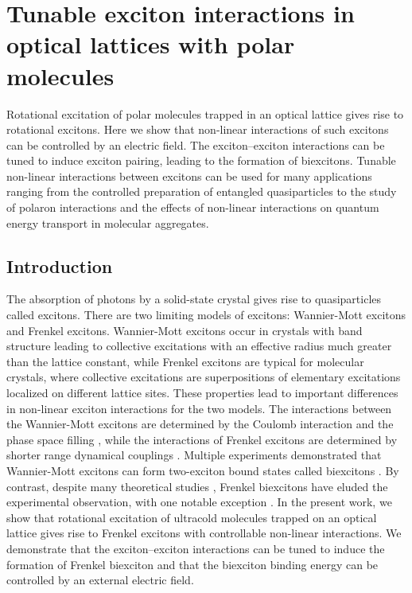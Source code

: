
\chapter{Tunable exciton interactions in optical lattices with polar molecules}
\label{ch:biexciton}

Rotational excitation of polar molecules trapped in an optical lattice gives rise to rotational excitons. Here we show
 that non-linear interactions of such excitons can be controlled by an electric field. The exciton--exciton interactions
 can be tuned to induce exciton pairing, leading to the formation of biexcitons. Tunable non-linear interactions
 between excitons can be used for many applications ranging from the controlled preparation of entangled
 quasiparticles to the study of polaron interactions and the effects of non-linear interactions on quantum energy
 transport in molecular aggregates. 


\section{ Introduction}  
The absorption of photons by a solid-state crystal gives rise to quasiparticles called excitons. There are two limiting
 models of excitons: Wannier-Mott excitons and Frenkel excitons. Wannier-Mott excitons occur in crystals with band
 structure leading to collective excitations with an effective radius much greater than the lattice constant, while
 Frenkel excitons are typical for molecular crystals, where collective excitations are superpositions of elementary
 excitations localized on different lattice sites. These properties lead to important differences in non-linear exciton
 interactions for the two models. The interactions between the Wannier-Mott excitons are determined by the
 Coulomb interaction and the phase space filling \cite{nolinear-wannier, nolinear-wannier2}, while the interactions of
 Frenkel excitons are determined by shorter range dynamical couplings \cite{agranovich}. Multiple experiments
 demonstrated that Wannier-Mott excitons can form two-exciton bound states called biexcitons \cite{wmxx, wmxx2,
 wmxx3, wmxx4, wmxx5, stevenson2006, Lozovik2002}. By contrast, despite many theoretical studies 
 \cite{vektaris, Ezaki1994, biexciton-theory-1,biexciton-theory-2}, Frenkel biexcitons have eluded the experimental
 observation, with one notable exception \cite{frenkelxx, frenkelxx2}. In the present work, we show that rotational
 excitation of ultracold molecules trapped on an optical lattice gives rise to Frenkel excitons with controllable 
non-linear interactions. We demonstrate that the exciton--exciton interactions can be tuned to induce the formation
 of Frenkel biexciton and that the biexciton binding energy can be controlled by an external electric field.    


